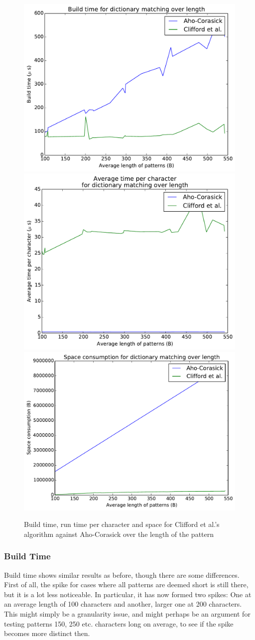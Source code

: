 \documentclass[ %
                    author={Dominic Joseph Moylett},
                    degree={MEng},
                     title={Dictionary Matching with Fingerprints},
                  subtitle={An Empirical Analysis},
                      type={research},
                      year={2015} ]{dissertation}
\begin{document}
\begin{figure}[t]
\begin{center}
  \includegraphics[width=0.5\linewidth]{build_length_200_1000}\\
  \includegraphics[width=0.5\linewidth]{time_length_200_1000}\includegraphics[width=0.5\linewidth]{size_length_200_1000}
\end{center}
\caption{Build time, run time per character and space for Clifford et al.'s algorithm against Aho-Corasick over the length of the pattern}
\label{fig:short-pattern-results}
\end{figure}

\subsubsection{Build Time}

Build time shows similar results as before, though there are some differences. First of all, the spike for cases where all patterns are deemed short is still there, but it is a lot less noticeable. In particular, it has now formed two spikes: One at an average length of 100 characters and another, larger one at 200 characters. This might simply be a granularity issue, and might perhaps be an argument for testing patterns 150, 250 etc. characters long on average, to see if the spike becomes more distinct then.
\end{document}
